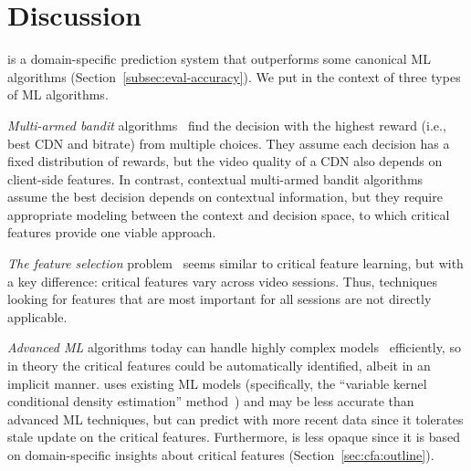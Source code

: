 \section{Discussion}
\label{sec:cfa:discuss}

\dda is a domain-specific prediction system that 
outperforms some canonical ML algorithms 
(Section~\ref{subsec:eval-accuracy}). 
We put \dda in the context of three types of 
ML algorithms.
\begin{packeditemize}
\item {\em Multi-armed bandit} algorithms~\cite{mab} 
find the decision with the highest reward (i.e., best 
CDN and bitrate) from multiple choices. 
They assume each decision has a fixed distribution 
of rewards, but the video quality of a CDN also 
depends on client-side features.
In contrast, contextual multi-armed bandit 
algorithms~\cite{cmab} assume the best decision 
depends on contextual information, but they require 
appropriate modeling between the context and 
decision space, to which critical features provide 
one viable approach.
\item {\em The feature selection} 
problem~\cite{feature-selection} seems similar to 
critical feature learning, but with a key difference: 
critical features vary across video sessions. 
Thus, techniques looking for features that are most 
important for all sessions are not directly applicable.
\item {\em Advanced ML} algorithms today can 
handle highly complex models~\cite{deeplearning, svm} 
efficiently, so in theory the critical features could be 
automatically identified, albeit in an implicit manner. 
\dda uses existing ML models (specifically, the ``variable 
kernel conditional density estimation'' 
method~\cite{terrell1992variable}) and may be less 
accurate than advanced ML techniques, but \dda can 
predict with more recent data since it tolerates stale 
update on the critical features. Furthermore, \dda is 
less opaque since it is based on domain-specific 
insights about critical features (Section~\ref{sec:cfa:outline}). 
\end{packeditemize}


